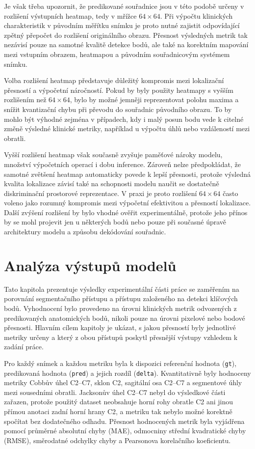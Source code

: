 \documentclass[male,czech,api_bc]{kitheses}
\begin{document}
Je však třeba upozornit, že predikované souřadnice jsou v této podobě určeny v rozlišení výstupních heatmap, tedy v mřížce $64 \times 64$. Při výpočtu klinických charakteristik v původním měřítku snímku je proto nutné zajistit odpovídající zpětný přepočet do rozlišení originálního obrazu. Přesnost výsledných metrik tak nezávisí pouze na samotné kvalitě detekce bodů, ale také na korektním mapování mezi vstupním obrazem, heatmapou a původním souřadnicovým systémem snímku.

Volba rozlišení heatmap představuje důležitý kompromis mezi lokalizační přesností a výpočetní náročností. Pokud by byly použity heatmapy s vyšším rozlišením než $64 \times 64$, bylo by možné jemněji reprezentovat polohu maxima a snížit kvantizační chybu při převodu do souřadnic původního obrazu. To by mohlo být výhodné zejména v případech, kdy i malý posun bodu vede k citelné změně výsledné klinické metriky, například u výpočtu úhlů nebo vzdáleností mezi obratli.

Vyšší rozlišení heatmap však současně zvyšuje paměťové nároky modelu, množství výpočetních operací i dobu inference. Zároveň nelze předpokládat, že samotné zvětšení heatmap automaticky povede k lepší přesnosti, protože výsledná kvalita lokalizace závisí také na schopnosti modelu naučit se dostatečně diskriminační prostorové reprezentace. V praxi je proto rozlišení $64 \times 64$ často voleno jako rozumný kompromis mezi výpočetní efektivitou a přesností lokalizace. Další zvýšení rozlišení by bylo vhodné ověřit experimentálně, protože jeho přínos by se mohl projevit jen u některých bodů nebo pouze při současné úpravě architektury modelu a způsobu dekódování souřadnic.


\chapter{Analýza výstupů modelů}

Tato kapitola prezentuje výsledky experimentální části práce se zaměřením na porovnání segmentačního přístupu a přístupu založeného na detekci klíčových bodů. Vyhodnocení bylo provedeno na úrovni klinických metrik odvozených z predikovaných anatomických bodů, nikoli pouze na úrovni pixelové nebo bodové přesnosti. Hlavním cílem kapitoly je ukázat, s jakou přesností byly jednotlivé metriky určeny a který z obou přístupů poskytl přesnější výstupy vzhledem k zadání práce.

Pro každý snímek a každou metriku byla k dispozici referenční hodnota (\texttt{gt}), predikovaná hodnota (\texttt{pred}) a jejich rozdíl (\texttt{delta}). Kvantitativně byly hodnoceny metriky Cobbův úhel C2--C7, sklon C2, sagitální osa C2--C7 a segmentové úhly mezi sousedními obratli. Jacksonův úhel C2--C7 nebyl do výsledkové části zařazen, protože použitý dataset neobsahuje horní rohy obratle C2 ani jinou přímou anotaci zadní horní hrany C2, a metriku tak nebylo možné korektně spočítat bez dodatečného odhadu. Přesnost hodnocených metrik byla vyjádřena pomocí průměrné absolutní chyby (MAE), odmocniny střední kvadratické chyby (RMSE), směrodatné odchylky chyby a Pearsonova korelačního koeficientu.
\end{document}
